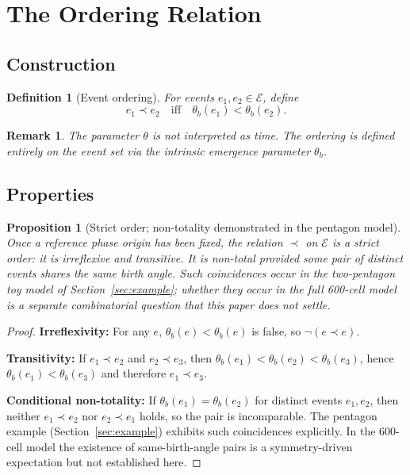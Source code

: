 \documentclass[12pt]{article}
\newtheorem{proposition}[theorem]{Proposition}
\newtheorem{definition}[theorem]{Definition}
\newtheorem{remark}[theorem]{Remark}
\newcommand{\Ecal}{\mathcal{E}}
\begin{document}
\section{The Ordering Relation}\label{sec:ordering}

\subsection{Construction}

\begin{definition}[Event ordering]\label{def:ordering}
For events $e_1, e_2 \in \Ecal$, define
\begin{equation}\label{eq:ordering}
    e_1 \prec e_2 \quad\text{iff}\quad \theta_b(e_1) < \theta_b(e_2).
\end{equation}
\end{definition}

\begin{remark}
The parameter $\theta$ is not interpreted as time. The ordering is defined entirely on the event set via the intrinsic emergence parameter $\theta_b$.
\end{remark}

\subsection{Properties}

\begin{proposition}[Strict order; non-totality demonstrated in the pentagon model]\label{prop:partial}
Once a reference phase origin has been fixed, the relation $\prec$ on $\Ecal$ is a strict order: it is irreflexive and transitive. It is non-total \emph{provided} some pair of distinct events shares the same birth angle. Such coincidences occur in the two-pentagon toy model of Section~\ref{sec:example}; whether they occur in the full 600-cell model is a separate combinatorial question that this paper does not settle.
\end{proposition}

\begin{proof}
\textbf{Irreflexivity:} For any $e$, $\theta_b(e) < \theta_b(e)$ is false, so $\neg(e \prec e)$.

\textbf{Transitivity:} If $e_1 \prec e_2$ and $e_2 \prec e_3$, then $\theta_b(e_1) < \theta_b(e_2) < \theta_b(e_3)$, hence $\theta_b(e_1) < \theta_b(e_3)$ and therefore $e_1 \prec e_3$.

\textbf{Conditional non-totality:} If $\theta_b(e_1) = \theta_b(e_2)$ for distinct events $e_1, e_2$, then neither $e_1 \prec e_2$ nor $e_2 \prec e_1$ holds, so the pair is incomparable. The pentagon example (Section~\ref{sec:example}) exhibits such coincidences explicitly. In the 600-cell model the existence of same-birth-angle pairs is a symmetry-driven expectation but not established here.
\end{proof}
\end{document}
